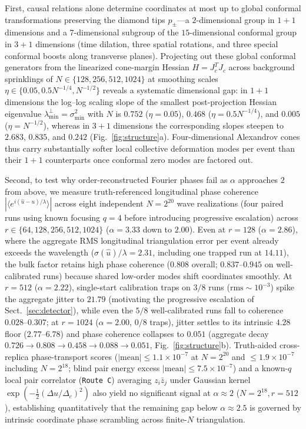 \documentclass[11pt,a4paper]{article}
\begin{document}
First, causal relations alone determine coordinates at most up to global
conformal transformations preserving the diamond tips $p_\pm$---a
$2$-dimensional group in $1+1$ dimensions and a $7$-dimensional subgroup of
the $15$-dimensional conformal group in $3+1$ dimensions (time dilation, three
spatial rotations, and three special conformal boosts along transverse planes).
Projecting out these global conformal generators from the linearized cone-margin Hessian
$H = J_c^T J_c$ across background sprinklings of $N \in \{128, 256, 512, 1024\}$ at
smoothing scales $\eta \in \{0.05, 0.5N^{-1/4}, N^{-1/2}\}$ reveals a systematic
dimensional gap: in $1+1$ dimensions the log--log scaling slope of the smallest
post-projection Hessian eigenvalue $\lambda_{\min}^\perp = \sigma_{\min}^2$ with $N$ is
$0.752$ ($\eta=0.05$), $0.468$ ($\eta=0.5N^{-1/4}$), and $0.005$ ($\eta=N^{-1/2}$), whereas
in $3+1$ dimensions the corresponding slopes steepen to $2.683$, $0.835$, and $0.242$
(Fig.~\ref{fig:structure}a). Four-dimensional Alexandrov cones thus carry
substantially softer local collective deformation modes per event than their
$1+1$ counterparts once conformal zero modes are factored out.

Second, to test why order-reconstructed Fourier phases fail as $\alpha$
approaches $2$ from above, we measure truth-referenced longitudinal phase coherence
$|\langle e^{i(\hat{u}-u)/\lambda}\rangle|$ across eight independent $N = 2^{20}$
wave realizations (four paired runs using known focusing $q=4$ before introducing
progressive escalation) across $r \in \{64, 128, 256, 512, 1024\}$
($\alpha = 3.33$ down to $2.00$). Even at $r = 128$ ($\alpha = 2.86$), where the
aggregate RMS longitudinal triangulation error per event already exceeds the
wavelength ($\sigma(\hat{u})/\lambda = 2.31$, including one trapped run at $14.11$),
the bulk factor retains high phase coherence ($0.808$ overall; $0.837$--$0.945$ on
well-calibrated runs) because shared low-order modes shift coordinates smoothly.
At $r = 512$ ($\alpha = 2.22$), single-start calibration traps on $3/8$ runs
($\text{rms} \sim 10^{-3}$) spike the aggregate jitter to $21.79$ (motivating the
progressive escalation of Sect.~\ref{sec:detector}), while even the $5/8$
well-calibrated runs fall to coherence $0.028$--$0.307$; at $r = 1024$
($\alpha = 2.00$, $0/8$ traps), jitter settles to its intrinsic $4.28$ floor
($2.77$--$6.78$) and phase coherence collapses to $0.051$ (aggregate decay
$0.726 \to 0.808 \to 0.458 \to 0.088 \to 0.051$, Fig.~\ref{fig:structure}b).
Truth-aided cross-replica phase-transport scores ($|\text{mean}| \le 1.1\times 10^{-7}$
at $N = 2^{20}$ and $\le 1.9\times 10^{-7}$ including $N = 2^{18}$; blind pair energy
excess $|\text{mean}| \le 7.5\times 10^{-7}$) and a known-$q$ local pair correlator (\texttt{Route~C})
averaging $z_i \bar{z}_j$
under Gaussian kernel $\exp(-\tfrac12(\Delta u/\Delta_c)^2)$ also yield no
significant signal at $\alpha \approx 2$ ($N=2^{18}, r=512$), establishing
quantitatively that the remaining gap below $\alpha \approx 2.5$ is governed by
intrinsic coordinate phase scrambling across finite-$N$ triangulation.
\end{document}
